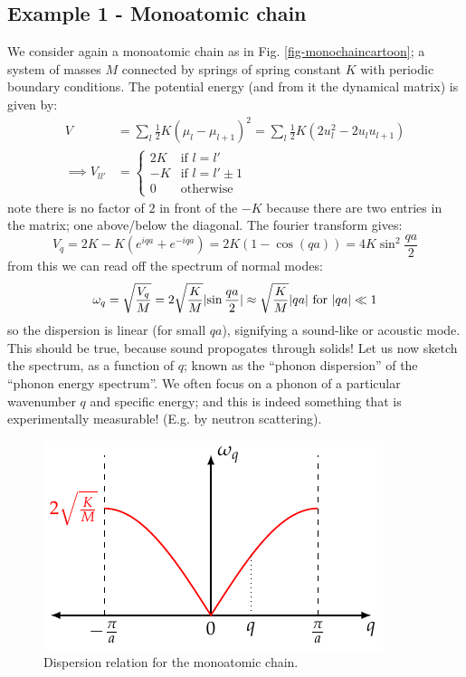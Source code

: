 \subsection{Example 1 - Monoatomic chain}
We consider again a monoatomic chain as in Fig. \ref{fig-monochaincartoon}; a system of masses $M$ connected by springs of spring constant $K$ with periodic boundary conditions. The potential energy (and from it the dynamical matrix) is given by:
\begin{equation}
    \begin{split}
        V &= \sum_l \frac{1}{2}K(\mu_{l} - \mu_{l+1})^2 = \sum_l \frac{1}{2}K\left(2u_l^2 - 2u_lu_{l+1}\right)
        \\ \implies  V_{ll'} &= \begin{cases}
            2K & \text{if $l = l'$}
            \\ -K & \text{if $l = l' \pm 1$}
            \\ 0 & \text{otherwise}
        \end{cases}
    \end{split}
\end{equation}
note there is no factor of $2$ in front of the $-K$ because there are two entries in the matrix; one above/below the diagonal. The fourier transform gives:
\begin{equation}
    V_q = 2K - K(e^{iqa} + e^{-iqa}) = 2K(1 - \cos(qa)) = 4K\sin^2\frac{qa}{2}
\end{equation}
from this we can read off the spectrum of normal modes:
\begin{equation}
    \omega_q = \sqrt{\frac{V_q}{M}} = 2\sqrt{\frac{K}{M}}\lvert \sin\frac{qa}{2} \rvert \approx \sqrt{\frac{K}{M}}\lvert qa \rvert \text{ for $\lvert qa \rvert \ll 1$}
\end{equation}
so the dispersion is linear (for small $qa$), signifying a sound-like or acoustic mode. This should be true, because sound propogates through solids! Let us now sketch the spectrum, as a function of $q$; known as the ``phonon dispersion'' of the ``phonon energy spectrum''. We often focus on a phonon of a particular wavenumber $q$ and specific energy; and this is indeed something that is experimentally measurable! (E.g. by neutron scattering).

\begin{figure}[htbp]
    \centering
    \includegraphics[]{Images/fig-monochaindispersion.pdf}
    \caption{Dispersion relation for the monoatomic chain.}
    \label{fig-monochaindispersion}
\end{figure}

